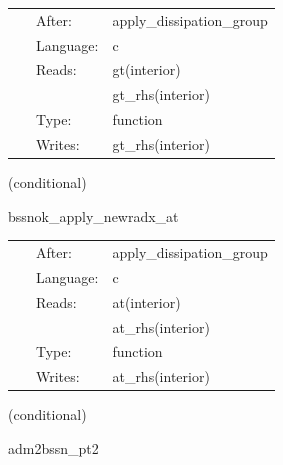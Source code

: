 \documentclass{article}
\begin{document}


\hspace{5mm}

 \begin{tabular*}{160mm}{cll} 
~ & After:  & apply\_dissipation\_group \\ 
~ & Language:  & c \\ 
~ & Reads:  & gt(interior) \\ 
~& ~ &gt\_rhs(interior)\\ 
~ & Type:  & function \\ 
~ & Writes:  & gt\_rhs(interior) \\ 
\end{tabular*} 


\vspace{5mm}

   (conditional) 

\hspace{5mm} bssnok\_apply\_newradx\_at 



\hspace{5mm}

 \begin{tabular*}{160mm}{cll} 
~ & After:  & apply\_dissipation\_group \\ 
~ & Language:  & c \\ 
~ & Reads:  & at(interior) \\ 
~& ~ &at\_rhs(interior)\\ 
~ & Type:  & function \\ 
~ & Writes:  & at\_rhs(interior) \\ 
\end{tabular*} 


\vspace{5mm}

   (conditional) 

\hspace{5mm} adm2bssn\_pt2 

\hspace{5mm}{\it function `adm2bssn\_pt2` generated by einsteinengine. } 


\hspace{5mm}
\end{document}
